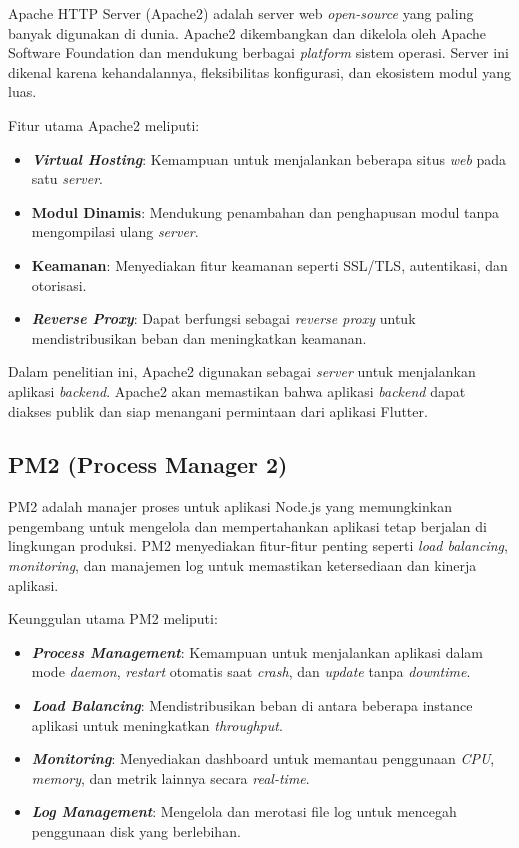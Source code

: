 Apache HTTP Server (Apache2) adalah server web \emph{open-source} yang paling banyak digunakan di dunia. Apache2 dikembangkan dan dikelola oleh Apache Software Foundation dan mendukung berbagai \emph{platform} sistem operasi. Server ini dikenal karena kehandalannya, fleksibilitas konfigurasi, dan ekosistem modul yang luas. \parencite*{apache2024}

Fitur utama Apache2 meliputi:
\begin{itemize}[nolistsep]
  \item \textbf{\emph{Virtual Hosting}}: Kemampuan untuk menjalankan beberapa situs \emph{web} pada satu \emph{server}.
  \item \textbf{Modul Dinamis}: Mendukung penambahan dan penghapusan modul tanpa mengompilasi ulang \emph{server}.
  \item \textbf{Keamanan}: Menyediakan fitur keamanan seperti SSL/TLS, autentikasi, dan otorisasi.
  \item \textbf{\emph{Reverse Proxy}}: Dapat berfungsi sebagai \emph{reverse proxy} untuk mendistribusikan beban dan meningkatkan keamanan.
\end{itemize}

Dalam penelitian ini, Apache2 digunakan sebagai \emph{server} untuk menjalankan aplikasi \emph{backend}. Apache2 akan memastikan bahwa aplikasi \emph{backend} dapat diakses publik dan siap menangani permintaan dari aplikasi Flutter.

\subsection{PM2 (Process Manager 2)}

PM2 adalah manajer proses untuk aplikasi Node.js yang memungkinkan pengembang untuk mengelola dan mempertahankan aplikasi tetap berjalan di lingkungan produksi. PM2 menyediakan fitur-fitur penting seperti \emph{load balancing}, \emph{monitoring}, dan manajemen log untuk memastikan ketersediaan dan kinerja aplikasi. \parencite*{pm22024}

Keunggulan utama PM2 meliputi:
\begin{itemize}[nolistsep]
  \item \textbf{\emph{Process Management}}: Kemampuan untuk menjalankan aplikasi dalam mode \emph{daemon}, \emph{restart} otomatis saat \emph{crash}, dan \emph{update} tanpa \emph{downtime}.
  \item \textbf{\emph{Load Balancing}}: Mendistribusikan beban di antara beberapa instance aplikasi untuk meningkatkan \emph{throughput}.
  \item \textbf{\emph{Monitoring}}: Menyediakan dashboard untuk memantau penggunaan \emph{CPU}, \emph{memory}, dan metrik lainnya secara \emph{real-time}.
  \item \textbf{\emph{Log Management}}: Mengelola dan merotasi file log untuk mencegah penggunaan disk yang berlebihan.
\end{itemize}

